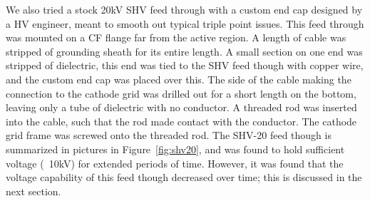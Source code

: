 We also tried a stock 20kV SHV feed through with a custom end cap designed by a \ac{HV} engineer, meant to smooth out typical triple point issues. This feed through was mounted on a CF flange far from the active region. A length of cable was stripped of grounding sheath for its entire length. A small section on one end was stripped of dielectric, this end was tied to the SHV feed though with copper wire, and the custom end cap was placed over this. The side of the cable making the connection to the cathode grid was drilled out for a short length on the bottom, leaving only a tube of dielectric with no conductor. A threaded rod was inserted into the cable, such that the rod made contact with the conductor. The cathode grid frame was screwed onto the threaded rod. The SHV-20 feed though is summarized in pictures in Figure~\ref{fig:shv20}, and was found to hold sufficient voltage (~10kV) for extended periods of time. However, it was found that the voltage capability of this feed though decreased over time; this is discussed in the next section.

